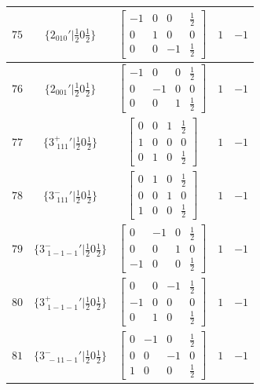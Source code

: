 \documentclass[fleqn,8pt]{jsarticle}
\begin{document}
\begin{longtable}{ccccc}
$ 75 $ & $ \{2{}_{010}{}'|\frac{1}{2} 0 \frac{1}{2}\} $ & $ \begin{bmatrix} -1 & 0 & 0 & \frac{1}{2} \\ 0 & 1 & 0 & 0 \\ 0 & 0 & -1 & \frac{1}{2} \end{bmatrix} $ & $ 1 $ & $ -1 $ \\ \hline
$ 76 $ & $ \{2{}_{001}{}'|\frac{1}{2} 0 \frac{1}{2}\} $ & $ \begin{bmatrix} -1 & 0 & 0 & \frac{1}{2} \\ 0 & -1 & 0 & 0 \\ 0 & 0 & 1 & \frac{1}{2} \end{bmatrix} $ & $ 1 $ & $ -1 $ \\ \hline
$ 77 $ & $ \{3^{+}_{\,\,111}{}'|\frac{1}{2} 0 \frac{1}{2}\} $ & $ \begin{bmatrix} 0 & 0 & 1 & \frac{1}{2} \\ 1 & 0 & 0 & 0 \\ 0 & 1 & 0 & \frac{1}{2} \end{bmatrix} $ & $ 1 $ & $ -1 $ \\ \hline
$ 78 $ & $ \{3^{-}_{\,\,111}{}'|\frac{1}{2} 0 \frac{1}{2}\} $ & $ \begin{bmatrix} 0 & 1 & 0 & \frac{1}{2} \\ 0 & 0 & 1 & 0 \\ 1 & 0 & 0 & \frac{1}{2} \end{bmatrix} $ & $ 1 $ & $ -1 $ \\ \hline
$ 79 $ & $ \{3^{-}_{\,\,1-1-1}{}'|\frac{1}{2} 0 \frac{1}{2}\} $ & $ \begin{bmatrix} 0 & -1 & 0 & \frac{1}{2} \\ 0 & 0 & 1 & 0 \\ -1 & 0 & 0 & \frac{1}{2} \end{bmatrix} $ & $ 1 $ & $ -1 $ \\ \hline
$ 80 $ & $ \{3^{+}_{\,\,1-1-1}{}'|\frac{1}{2} 0 \frac{1}{2}\} $ & $ \begin{bmatrix} 0 & 0 & -1 & \frac{1}{2} \\ -1 & 0 & 0 & 0 \\ 0 & 1 & 0 & \frac{1}{2} \end{bmatrix} $ & $ 1 $ & $ -1 $ \\ \hline
$ 81 $ & $ \{3^{-}_{\,\,-11-1}{}'|\frac{1}{2} 0 \frac{1}{2}\} $ & $ \begin{bmatrix} 0 & -1 & 0 & \frac{1}{2} \\ 0 & 0 & -1 & 0 \\ 1 & 0 & 0 & \frac{1}{2} \end{bmatrix} $ & $ 1 $ & $ -1 $ \\ \hline

\end{longtable}
\end{document}
